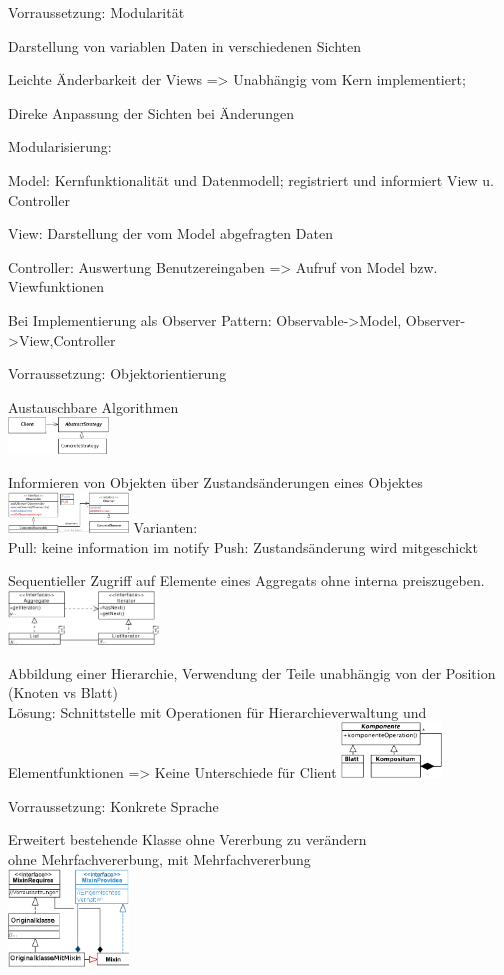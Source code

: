 Vorraussetzung: Modularität

Darstellung von variablen Daten in verschiedenen Sichten

Leichte Änderbarkeit der Views => Unabhängig vom Kern implementiert;

Direke Anpassung der Sichten bei Änderungen

Modularisierung:

Model: Kernfunktionalität und Datenmodell; registriert und informiert View u. Controller

View: Darstellung der vom Model abgefragten Daten

Controller: Auswertung Benutzereingaben => Aufruf von Model bzw. Viewfunktionen

Bei Implementierung als Observer Pattern: Observable->Model, Observer->View,Controller

Vorraussetzung: Objektorientierung

 Austauschbare Algorithmen\\
\includegraphics[width=0.2\textwidth]{strategy}

 Informieren von Objekten über Zustandsänderungen eines Objektes\\
\includegraphics[width=0.24\textwidth]{observer}
Varianten:\\
Pull: keine information im notify
Push: Zustandsänderung wird mitgeschickt

 Sequentieller Zugriff auf Elemente eines Aggregats ohne interna preiszugeben. 
\includegraphics[width=0.3\textwidth]{iterator}

 Abbildung einer Hierarchie, Verwendung der Teile unabhängig von der Position (Knoten vs Blatt)\\
Lösung: Schnittstelle mit Operationen für Hierarchieverwaltung und Elementfunktionen => Keine Unterschiede für Client
\includegraphics[width=0.2\textwidth]{Composite}

Vorraussetzung: Konkrete Sprache

 Erweitert bestehende Klasse ohne Vererbung zu verändern\\
\textcolor{mehrblau}{ohne Mehrfachvererbung}, \textcolor{mehrred}{mit Mehrfachvererbung}\\
\includegraphics[width=0.24\textwidth]{mixinjava}
